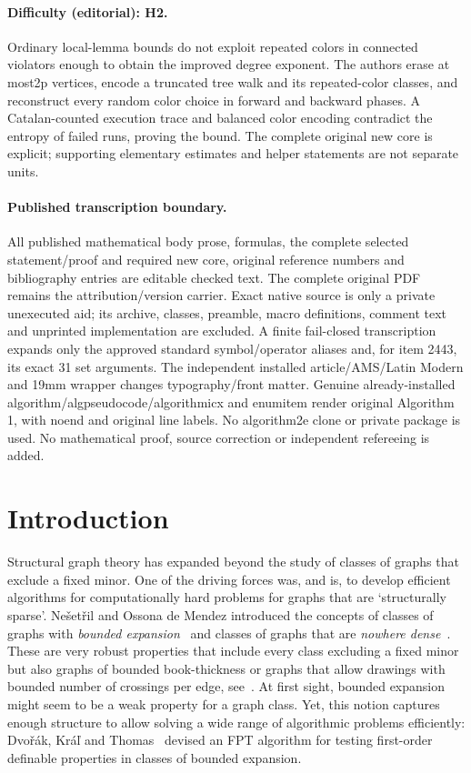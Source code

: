 \documentclass[11pt]{article}
\begin{document}
\paragraph{Difficulty (editorial): H2.} Ordinary local-lemma bounds do not exploit repeated colors in connected violators enough to obtain the improved degree exponent. The authors erase at most2p vertices, encode a truncated tree walk and its repeated-color classes, and reconstruct every random color choice in forward and backward phases. A Catalan-counted execution trace and balanced color encoding contradict the entropy of failed runs, proving the bound. The complete original new core is explicit; supporting elementary estimates and helper statements are not separate units.
\paragraph{Published transcription boundary.} All published mathematical body prose, formulas, the complete selected statement/proof and required new core, original reference numbers and bibliography entries are editable checked text. The complete original PDF remains the attribution/version carrier. Exact native source is only a private unexecuted aid; its archive, classes, preamble, macro definitions, comment text and unprinted implementation are excluded. A finite fail-closed transcription expands only the approved standard symbol/operator aliases and, for item 2443, its exact 31 set arguments. The independent installed article/AMS/Latin Modern and 19mm wrapper changes typography/front matter. Genuine already-installed algorithm/algpseudocode/algorithmicx and enumitem render original Algorithm 1, with noend and original line labels. No algorithm2e clone or private package is used. No mathematical proof, source correction or independent refereeing is added.
\clearpage
\section{Introduction}
Structural graph theory has expanded beyond the study of
classes of graphs that exclude a fixed minor.
One of the driving forces was, and is, to develop efficient algorithms 
for computationally hard problems for graphs that are `structurally sparse'.
Ne{\v{s}}et{\v{r}}il and Ossona de Mendez introduced the concepts of 
classes of graphs with 
\emph{bounded expansion}~\cite{NOdM08} and 
classes of graphs that are \emph{nowhere dense}~\cite{NOdM11}.
These are very robust properties that include 
every class excluding a fixed minor but also 
graphs of bounded book-thickness or
graphs that allow drawings with bounded number of crossings per edge,
see~\cite{NOdMW12}.
At first sight, bounded expansion might seem to be a weak property for
a graph class.
Yet, this notion captures enough structure to allow solving a wide range
of algorithmic problems efficiently: 
Dvořák, Kráľ and Thomas~\cite{DKT12} devised an FPT algorithm for testing 
first-order definable properties in classes of bounded expansion.
\end{document}

